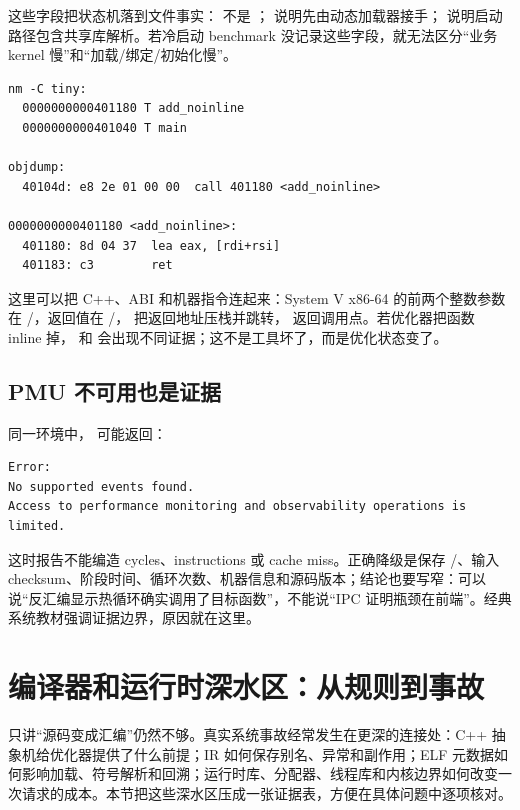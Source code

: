 这些字段把状态机落到文件事实： 不是 ； 说明先由动态加载器接手； 说明启动路径包含共享库解析。若冷启动 benchmark 没记录这些字段，就无法区分“业务 kernel 慢”和“加载/绑定/初始化慢”。

\begin{lstlisting}[numbers=none,caption={符号和反汇编证据片段}]
nm -C tiny:
  0000000000401180 T add_noinline
  0000000000401040 T main

objdump:
  40104d: e8 2e 01 00 00  call 401180 <add_noinline>

0000000000401180 <add_noinline>:
  401180: 8d 04 37  lea eax, [rdi+rsi]
  401183: c3        ret
\end{lstlisting}

这里可以把 C++、ABI 和机器指令连起来：System V x86-64 的前两个整数参数在 /，返回值在 /， 把返回地址压栈并跳转， 返回调用点。若优化器把函数 inline 掉， 和  会出现不同证据；这不是工具坏了，而是优化状态变了。

\subsection{PMU 不可用也是证据}

同一环境中， 可能返回：

\begin{lstlisting}[numbers=none,caption={PMU 权限或平台受限时的真实形态}]
Error:
No supported events found.
Access to performance monitoring and observability operations is limited.
\end{lstlisting}

这时报告不能编造 cycles、instructions 或 cache miss。正确降级是保存 /、输入 checksum、阶段时间、循环次数、机器信息和源码版本；结论也要写窄：可以说“反汇编显示热循环确实调用了目标函数”，不能说“IPC 证明瓶颈在前端”。经典系统教材强调证据边界，原因就在这里。

\section{编译器和运行时深水区：从规则到事故}

只讲“源码变成汇编”仍然不够。真实系统事故经常发生在更深的连接处：C++ 抽象机给优化器提供了什么前提；IR 如何保存别名、异常和副作用；ELF 元数据如何影响加载、符号解析和回溯；运行时库、分配器、线程库和内核边界如何改变一次请求的成本。本节把这些深水区压成一张证据表，方便在具体问题中逐项核对。

